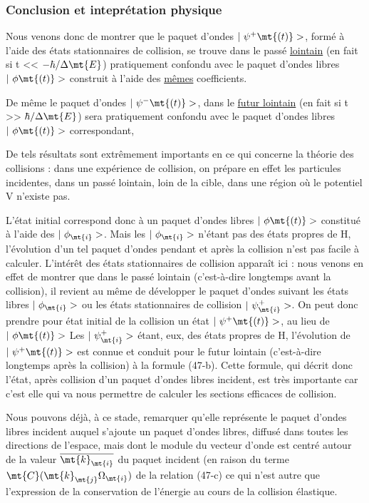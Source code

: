 

\subsubsection{Conclusion et inteprétation physique}%
Nous venons donc de montrer que le paquet d'ondes $|\ \psi^+\mt{(t)}>$,
formé à l'aide des états stationnaires de collision, se trouve dans le
passé \ul{lointain} (en fait si t << $-\hbar/\Delta\mt{E}$) pratiquement confondu avec le
paquet d'ondes libres $|\ \phi\mt{(t)}>$ construit à l'aide des \ul{mêmes} coefficients.

De même le paquet d'ondes $|\ \psi^-\mt{(t)}>$, dans le \ul{futur lointain}
(en fait si t >> $\hbar/\Delta\mt{E}$) sera pratiquement confondu avec le paquet d'ondes
libres $|\ \phi\mt{(t)}>$ correspondant,

De tels résultats sont extrêmement importants en ce qui concerne
la théorie des collisions : dans une expérience de collision, on prépare
en effet les particules incidentes, dans un passé lointain, loin de la
cible, dans une région où le potentiel V n'existe pas.

L'état initial correspond donc à un paquet d'ondes libres
$|\ \phi\mt{(t)}>$ constitué à l'aide des $|\ \phi_\mt{i}>$. Mais les $|\ \phi_\mt{i}>$ n'étant pas des
états propres de H, l'évolution d'un tel paquet d'ondes pendant et après
la collision n'est pas facile à calculer. L'intérêt des états stationnaires de
collision apparaît ici : nous venons en effet de montrer que dans
le passé lointain (c'est-à-dire longtemps avant la collision), il revient
au même de développer le paquet d'ondes suivant les états libres $|\ \phi_\mt{i}>$ ou
les états stationnaires de collision $|\ \psi_\mt{i}^+>$. On peut donc prendre pour
état initial de la collision un état $|\ \psi^+\mt{(t)}>$, au lieu de $|\ \phi\mt{(t)}>$ Les
$|\ \psi_\mt{i}^+>$ étant, eux, des états propres de H, l'évolution de $|\ \psi^+\mt{(t)}>$ est
connue et conduit pour le futur lointain (c'est-à-dire longtemps après la
collision) à la formule (47-b). Cette formule, qui décrit donc l'état,
après collision d'un paquet d'ondes libres incident, est très importante
car c'est elle qui va nous permettre de calculer les sections efficaces
de collision.

Nous pouvons déjà, à ce stade, remarquer qu'elle représente le
paquet d'ondes libres incident auquel s'ajoute un paquet d'ondes libres,
diffusé dans toutes les directions de l'espace, mais dont le module du
vecteur d'onde est centré autour de la valeur $\overline{\mt{k}_\mt{i}}$ du paquet incident
(en raison du terme $\mt{C}(\mt{k}_\mt{j }\Omega_\mt{i})$ de la relation (47-c) ce qui n'est autre
que l'expression de la conservation de l'énergie au cours de la collision élastique.

